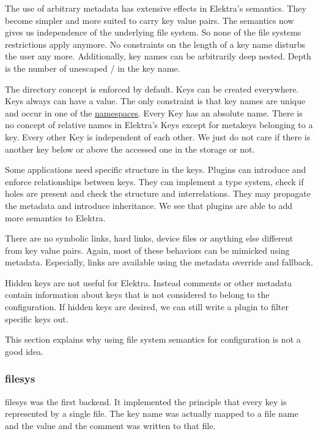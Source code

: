 The use of arbitrary metadata has extensive effects in Elektra’s semantics. They become simpler and more suited to carry key value pairs. The semantics now gives us independence of the underlying file system. So none of the file system\textquotesingle{}s restrictions apply anymore. No constraints on the length of a key name disturbs the user any more. Additionally, key names can be arbitrarily deep nested. Depth is the number of unescaped {\ttfamily /} in the key name.

The directory concept is enforced by default. Keys can be created everywhere. Keys always can have a value. The only constraint is that key names are unique and occur in one of the \hyperlink{md_doc_help_elektra-namespaces_doc_help_elektra-namespaces_md}{namespaces}. Every Key has an absolute name. There is no concept of relative names in Elektra’s Keys except for metakeys belonging to a key. Every other Key is independent of each other. We just do not care if there is another key below or above the accessed one in the storage or not.

Some applications need specific structure in the keys. Plugins can introduce and enforce relationships between keys. They can implement a type system, check if holes are present and check the structure and interrelations. They may propagate the metadata and introduce inheritance. We see that plugins are able to add more semantics to Elektra.

There are no symbolic links, hard links, device files or anything else different from key value pairs. Again, most of these behaviors can be mimicked using metadata. Especially, links are available using the metadata {\ttfamily override} and {\ttfamily fallback}.

Hidden keys are not useful for Elektra. Instead comments or other metadata contain information about keys that is not considered to belong to the configuration. If hidden keys are desired, we can still write a plugin to filter specific keys out.

This section explains why using file system semantics for configuration is not a good idea.

\subsubsection*{filesys}

{\ttfamily filesys} was the first backend. It implemented the principle that every key is represented by a single file. The key name was actually mapped to a file name and the value and the comment was written to that file.

